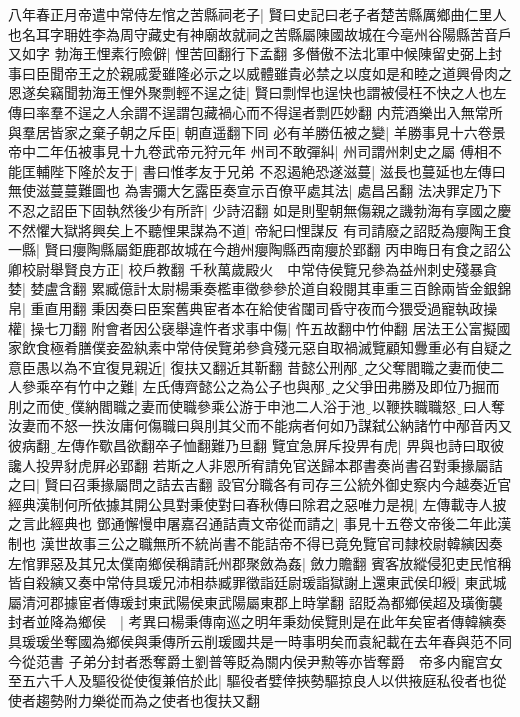 八年春正月帝遣中常侍左悺之苦縣祠老子|{
	賢曰史記曰老子者楚苦縣厲鄉曲仁里人也名耳字耼姓李為周守藏史有神廟故就祠之苦縣屬陳國故城在今亳州谷陽縣苦音戶又如字}
勃海王悝素行險僻|{
	悝苦回翻行下孟翻}
多僭傲不法北軍中候陳留史弼上封事曰臣聞帝王之於親戚愛雖隆必示之以威體雖貴必禁之以度如是和睦之道興骨肉之恩遂矣竊聞勃海王悝外聚剽輕不逞之徒|{
	賢曰剽悍也逞快也謂被侵枉不快之人也左傳曰率羣不逞之人余謂不逞謂包藏禍心而不得逞者剽匹妙翻}
内荒酒樂出入無常所與羣居皆家之棄子朝之斥臣|{
	朝直遥翻下同}
必有羊勝伍被之變|{
	羊勝事見十六卷景帝中二年伍被事見十九卷武帝元狩元年}
州司不敢彈糾|{
	州司謂州刺史之屬}
傅相不能匡輔陛下隆於友于|{
	書曰惟孝友于兄弟}
不忍遏絶恐遂滋蔓|{
	滋長也蔓延也左傳曰無使滋蔓蔓難圖也}
為害彌大乞露臣奏宣示百僚平處其法|{
	處昌呂翻}
法决罪定乃下不忍之詔臣下固執然後少有所許|{
	少詩沼翻}
如是則聖朝無傷親之譏勃海有享國之慶不然懼大獄將興矣上不聽悝果謀為不道|{
	帝紀曰悝謀反}
有司請廢之詔貶為癭陶王食一縣|{
	賢曰癭陶縣屬鉅鹿郡故城在今趙州癭陶縣西南癭於郢翻}
丙申晦日有食之詔公卿校尉舉賢良方正|{
	校戶教翻}
千秋萬歲殿火　中常侍侯覽兄參為益州刺史殘暴貪婪|{
	婪盧含翻}
累臧億計太尉楊秉奏檻車徵參參於道自殺閱其車重三百餘兩皆金銀錦帛|{
	重直用翻}
秉因奏曰臣案舊典宦者本在給使省闥司昏守夜而今猥受過寵執政操權|{
	操七刀翻}
附會者因公襃舉違忤者求事中傷|{
	忤五故翻中竹仲翻}
居法王公富擬國家飲食極肴膳僕妾盈紈素中常侍侯覽弟參貪殘元惡自取禍滅覽顧知釁重必有自疑之意臣愚以為不宜復見親近|{
	復扶又翻近其靳翻}
昔懿公刑邴之父奪閻職之妻而使二人參乘卒有竹中之難|{
	左氏傳齊懿公之為公子也與邴之父爭田弗勝及即位乃掘而刖之而使僕納閻職之妻而使職參乘公游于申池二人浴于池以鞭抶職職怒曰人奪汝妻而不怒一抶汝庸何傷職曰與刖其父而不能病者何如乃謀弑公納諸竹中邴音丙又彼病翻左傳作歜昌欲翻卒子恤翻難乃旦翻}
覽宜急屏斥投畀有虎|{
	畀與也詩曰取彼讒人投畀豺虎屛必郢翻}
若斯之人非恩所宥請免官送歸本郡書奏尚書召對秉掾屬詰之曰|{
	賢曰召秉掾屬問之詰去吉翻}
設官分職各有司存三公統外御史察内今越奏近官經典漢制何所依據其開公具對秉使對曰春秋傳曰除君之惡唯力是視|{
	左傳載寺人披之言此經典也}
鄧通懈慢申屠嘉召通詰責文帝從而請之|{
	事見十五卷文帝後二年此漢制也}
漢世故事三公之職無所不統尚書不能詰帝不得已竟免覽官司隸校尉韓縯因奏左悺罪惡及其兄太僕南鄉侯稱請託州郡聚斂為姦|{
	斂力贍翻}
賓客放縱侵犯吏民悺稱皆自殺縯又奏中常侍具瑗兄沛相恭臧罪徵詣廷尉瑗詣獄謝上還東武侯印綬|{
	東武城屬清河郡據宦者傳瑗封東武陽侯東武陽屬東郡上時掌翻}
詔貶為都鄉侯超及璜衡襲封者並降為鄉侯　|{
	考異曰楊秉傳南巡之明年秉劾侯覽則是在此年矣宦者傳韓縯奏具瑗瑗坐奪國為鄉侯與秉傳所云削瑗國共是一時事明矣而袁紀載在去年春與范不同今從范書}
子弟分封者悉奪爵土劉普等貶為關内侯尹勲等亦皆奪爵　帝多内寵宫女至五六千人及驅役從使復兼倍於此|{
	驅役者嬖倖挾勢驅掠良人以供掖庭私役者也從使者趨勢附力樂從而為之使者也復扶又翻}
